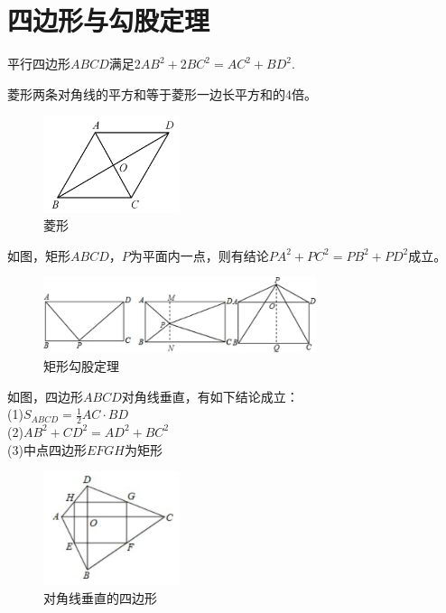 \documentclass{ecnuthesis}
\begin{document}
\section{四边形与勾股定理}
\begin{conclusion}
    平行四边形$ABCD$满足$2AB^2+2BC^2=AC^2+BD^2$.
\end{conclusion}
\begin{corollary}
    菱形两条对角线的平方和等于菱形一边长平方和的4倍。
\end{corollary}
\begin{figure}[H]
\centering
\includegraphics[width=4cm]{picture/606.png}
\caption{菱形}
\end{figure}
\begin{model}
    如图，矩形$ABCD$，$P$为平面内一点，则有结论$PA^2+PC^2=PB^2+PD^2$成立。
\end{model}
\begin{figure}[H]
\centering
\includegraphics[width=8cm]{picture/660.png}
\caption{矩形勾股定理}
\end{figure}
\begin{model}
    如图，四边形$ABCD$对角线垂直，有如下结论成立： \\
    (1)$S_{ABCD}=\frac{1}{2}AC·BD$ \\
    (2)$AB^2+CD^2=AD^2+BC^2$ \\
    (3)中点四边形$EFGH$为矩形
\end{model}
\begin{figure}[H]
\centering
\includegraphics[width=4cm]{picture/665.png}
\caption{对角线垂直的四边形}
\end{figure}
\end{document}
